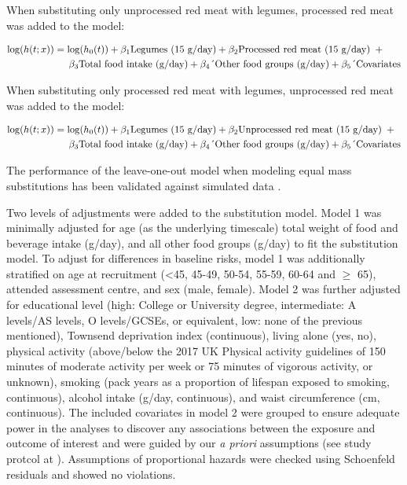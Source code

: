 \documentclass[nutrients,article,submit,moreauthors,pdftex]{Definitions/mdpi}
\begin{document}
\noindent When substituting only unprocessed red meat with legumes,
processed red meat was added to the model:

{\small
\begin{align}
\log(h(t;x)) &= \log(h_0(t)) + \beta_1 \text{Legumes (15 g/day)} + \beta_2 \text{Processed red meat (15 g/day)} \hspace{0.5em} + \nonumber \\
&\quad \hspace{0.5em} \beta_3 \text{Total food intake (g/day)} + \beta_4 \text{´Other food groups (g/day)} + \beta_5 \text{´Covariates}
\end{align}
}

\noindent When substituting only processed red meat with legumes,
unprocessed red meat was added to the model:

{\small
\begin{align}
\log(h(t;x)) &= \log(h_0(t)) + \beta_1 \text{Legumes (15 g/day)} + \beta_2 \text{Unprocessed red meat (15 g/day)} \hspace{0.5em} + \nonumber \\
&\quad \hspace{0.5em} \beta_3 \text{Total food intake (g/day)}  + \beta_4 \text{´Other food groups (g/day)} + \beta_5 \text{´Covariates}
\end{align}
}

\noindent The performance of the leave-one-out model when modeling equal
mass substitutions has been validated against simulated data
\citep{Tomova2022}.

Two levels of adjustments were added to the substitution model. Model 1
was minimally adjusted for age (as the underlying timescale) total
weight of food and beverage intake (g/day), and all other food groups
(g/day) to fit the substitution model. To adjust for differences in
baseline risks, model 1 was additionally stratified on age at
recruitment (\textless45, 45-49, 50-54, 55-59, 60-64 and \(\geq\) 65), attended
assessment centre, and sex (male, female). Model 2 was further adjusted
for educational level (high: College or University degree, intermediate:
A levels/AS levels, O levels/GCSEs, or equivalent, low: none of the
previous mentioned), Townsend deprivation index (continuous), living
alone (yes, no), physical activity (above/below the 2017 UK Physical
activity guidelines of 150 minutes of moderate activity per week or 75
minutes of vigorous activity, or unknown), smoking (pack years as a
proportion of lifespan exposed to smoking, continuous), alcohol intake
(g/day, continuous), and waist circumference (cm, continuous). The
included covariates in model 2 were grouped to ensure adequate power in
the analyses to discover any associations between the exposure and
outcome of interest and were guided by our \emph{a priori} assumptions (see
study protcol at \citep{protocol}). Assumptions of proportional hazards were
checked using Schoenfeld residuals and showed no violations.
\end{document}
